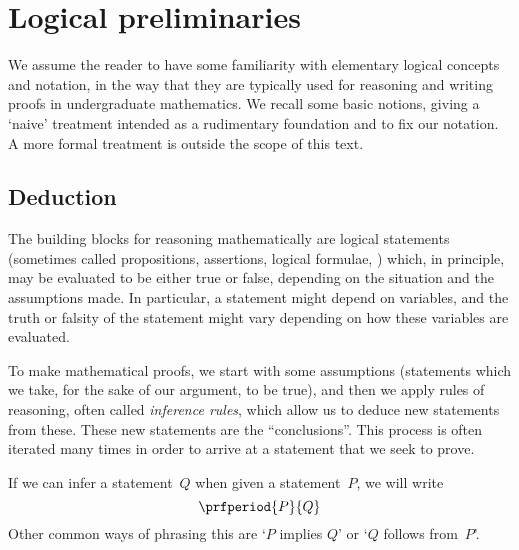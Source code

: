 
\section{Logical preliminaries}
\label{sec:logical-prelim}


We assume the reader to have some familiarity with elementary logical concepts and notation, in the way that they are typically used for reasoning and writing proofs in undergraduate mathematics.
We recall some basic notions, giving a `naive' treatment intended as a rudimentary foundation and to fix our notation.
A more formal treatment is outside the scope of this text.


\subsection{Deduction}

The building blocks for reasoning mathematically are logical statements (sometimes called propositions, assertions, logical formulae, \etc) which, in principle, may be evaluated to be either true or false, depending on the situation and the assumptions made.
In particular, a statement might depend on variables, and the truth or falsity of the statement might vary depending on how these variables are evaluated.

To make mathematical proofs, we start with some assumptions (statements which we take, for the sake of our argument, to be true), and then we apply rules of reasoning, often called \emph{inference rules}, which allow us to deduce new statements from these.
These new statements are the ``conclusions''.
This process is often iterated many times in order to arrive at a statement that we seek to prove.

If we can infer a statement~$Q$ when given a statement~$P$, we will write
\begin{equation*}
    \prfperiod
    {P}{Q}
\end{equation*}
Other common ways of phrasing this are `$P$ implies $Q$' or `$Q$ follows from~$P$'.

